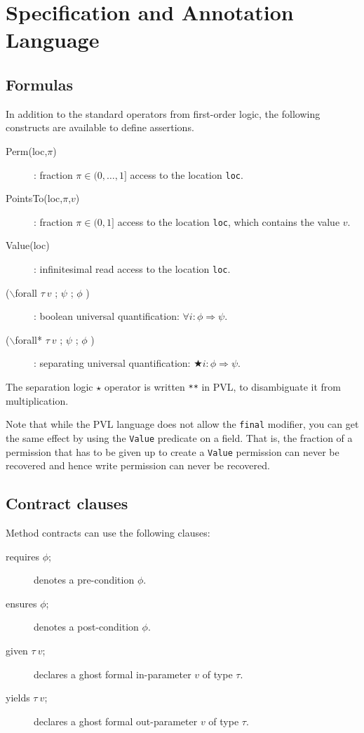 \section{Specification and Annotation Language}

\subsection{Formulas}

In addition to the standard operators from first-order logic, the
following constructs are available to define assertions.
\begin{description}
\item[Perm(loc,$\pi$)]: fraction $\pi \in (0,\ldots,1]$ access to  the location \lstinline+loc+. 
\item[PointsTo(loc,$\pi$,$v$)]: fraction $\pi \in (0,1]$ access to the location \lstinline+loc+, which contains the value $v$.
\item[Value(loc)]: infinitesimal read access to the location \lstinline+loc+.
\item[($\backslash$forall $\tau~v$ ; $\psi$ ; $\phi$ )]: boolean universal quantification: $\forall i : \phi \Rightarrow \psi$.
\item[($\backslash$forall* $\tau~v$ ; $\psi$ ; $\phi$ )]: separating universal quantification: $\bigstar i : \phi \Rightarrow \psi$.
\end{description}

The separation logic \(\star\) operator is written \lstinline+**+ in
PVL, to disambiguate it from multiplication.

Note that while the PVL language does not allow the \lstinline+final+ modifier,
you can get the same effect by using the \lstinline+Value+ predicate on a field.
That is, the fraction of a permission that has to be given up to create
a \lstinline+Value+ permission can never be recovered and hence 
write permission can never be recovered.

\subsection{Contract clauses}

Method contracts can use the following clauses:
\begin{description}
\item[requires $\phi$;] denotes a pre-condition $\phi$.
\item[ensures $\phi$;] denotes a post-condition $\phi$.
\item[given $\tau~v$;] declares a ghost formal in-parameter $v$ of type $\tau$.
\item[yields $\tau~v$;] declares a ghost formal out-parameter $v$ of type $\tau$.
\end{description}

